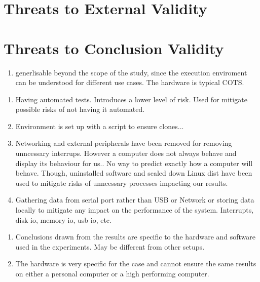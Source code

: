 
\section{Threats to External Validity}
\section{Threats to Conclusion Validity}

\begin{enumerate}
\item generlisable beyond the scope of the study, since the execution enviroment can be understood for different use cases. The hardware is typical COTS. 
\end{enumerate}

\begin{enumerate}
\item Having automated tests. Introduces a lower level of risk. Used for mitigate possible risks of not having it automated.
\item Environment is set up with a script to ensure clones...
\item Networking and external peripherals have been removed for removing unncessary interrups. However a computer does not always behave and display its behaviour for us.. No way to predict exactly how a computer will behave. Though, uninstalled software and scaled down Linux dist have been used to mitigate risks of unncessary processes impacting our results.
\item Gathering data from serial port rather than USB or Network or storing data locally to mitigate any impact on the performance of the system. Interrupts, disk io, memory io, usb io, etc.

\end{enumerate}

\begin{enumerate}
\item Conclusions drawn from the results are specific to the hardware and software used in the experiments. May be different from other setups.
\item The hardware is very specific for the case and cannot ensure the same results on either a personal computer or a high performing computer.

\end{enumerate}


